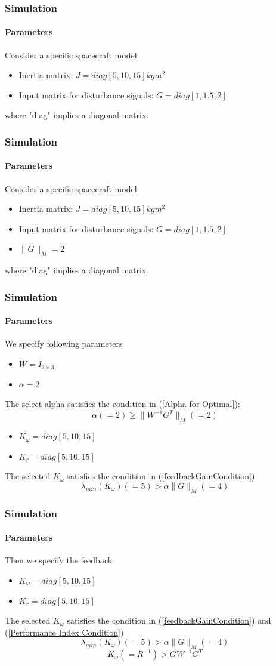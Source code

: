 \documentclass{beamer}
\begin{document}
\begin{frame}
\frametitle{Simulation}
\framesubtitle{Parameters}
Consider a specific spacecraft model:
\begin{itemize}
	\item Inertia matrix: $J=diag[5,10,15]kgm^{2}$
	\item Input matrix for disturbance signals: $G=diag[1,1.5,2]$
\end{itemize}
where "diag" implies a diagonal matrix. 
\end{frame}

\begin{frame}
\frametitle{Simulation}
\framesubtitle{Parameters}
Consider a specific spacecraft model:
\begin{itemize}
	\item Inertia matrix: $J=diag[5,10,15]kgm^{2}$
	\item Input matrix for disturbance signals: $G=diag[1,1.5,2]$
	\item $\lVert G\rVert_{M}=2$
\end{itemize}
where "diag" implies a diagonal matrix. 
\end{frame}

\begin{frame}
\frametitle{Simulation}
\framesubtitle{Parameters}
We specify following parameters
\begin{itemize}
	\item $W=I_{3\times 3}$
	\item $\alpha=2$
\end{itemize}
The select alpha satisfies the condition in (\ref{Alpha for Optimal}):
$$\alpha(=2)\geq\lVert W^{-1}G^{T}\rVert_{M}(=2)$$
\begin{itemize}
	\item $K_{\omega}=diag[5,10,15]$
	\item $K_{r}=diag[5,10,15]$
\end{itemize}
The selected $K_{\omega}$ satisfies the condition in (\ref{feedbackGainCondition})
$$\lambda_{min}(K_{\omega})(=5)>\alpha\lVert G\rVert_{M}(=4)$$
\end{frame}

\begin{frame}
\frametitle{Simulation}
\framesubtitle{Parameters}
Then we specify the feedback:
\begin{itemize}
	\item $K_{\omega}=diag[5,10,15]$
	\item $K_{r}=diag[5,10,15]$
\end{itemize}
The selected $K_{\omega}$ satisfies the condition in (\ref{feedbackGainCondition}) and (\ref{Performance Index Condition})
$$\lambda_{min}(K_{\omega})(=5)>\alpha\lVert G\rVert_{M}(=4)$$
$$K_{\omega}(=R^{-1})>GW^{-1}G^{T}$$
\end{frame}
\end{document}
